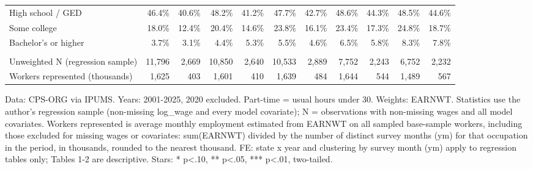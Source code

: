 \begin{table}[!t]
\begin{tabular}{l|rrrrrrrrrr}
High school / GED & 46.4\% & 40.6\% & 48.2\% & 41.2\% & 47.7\% & 42.7\% & 48.6\% & 44.3\% & 48.5\% & 44.6\% \\
Some college & 18.0\% & 12.4\% & 20.4\% & 14.6\% & 23.8\% & 16.1\% & 23.4\% & 17.3\% & 24.8\% & 18.7\% \\
Bachelor's or higher & 3.7\% & 3.1\% & 4.4\% & 5.3\% & 5.5\% & 4.6\% & 6.5\% & 5.8\% & 8.3\% & 7.8\% \\
\midrule\addlinespace[2.5pt]
\multicolumn{11}{l}{Sample} \\[2.5pt] 
\midrule\addlinespace[2.5pt]
Unweighted N (regression sample) & 11,796 & 2,669 & 10,850 & 2,640 & 10,533 & 2,889 & 7,752 & 2,243 & 6,752 & 2,232 \\
Workers represented (thousands) & 1,625 & 403 & 1,601 & 410 & 1,639 & 484 & 1,644 & 544 & 1,489 & 567 \\
\bottomrule
\end{tabular}\par\raggedright
\begin{minipage}{\linewidth}
Data: CPS-ORG via IPUMS. Years: 2001-2025, 2020 excluded. Part-time = usual hours under 30. Weights: EARNWT. Statistics use the author's regression sample (non-missing log\_wage and every model covariate); N = observations with non-missing wages and all model covariates. Workers represented is average monthly employment estimated from EARNWT on all sampled base-sample workers, including those excluded for missing wages or covariates: sum(EARNWT) divided by the number of distinct survey months (ym) for that occupation in the period, in thousands, rounded to the nearest thousand. FE: state x year and clustering by survey month (ym) apply to regression tables only; Tables 1-2 are descriptive. Stars: * p<.10, ** p<.05, *** p<.01, two-tailed.\\
\end{minipage}
\end{table}
